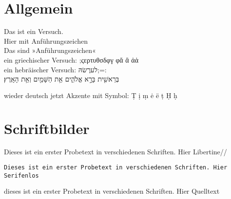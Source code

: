 \documentclass{report}
\begin{document}
\section{Allgemein}
Das ist ein Versuch. \\
Hier mit \glqq Anführungszeichen\grqq\\
Das sind »Anführungszeichen« \\

ein griechischer Versuch: ;ςερτυθσδφγ φἄ ἂ ἀἁ\\

ein hebräischer Versuch: לערֶשׂהּ;=:\\ 
בְּרֵאשִׁ֖ית בָּרָ֣א אֱלֹהִ֑ים אֵ֥ת הַשָּׁמַ֖יִם וְאֵ֥ת הָאָֽרֶץ׃

wieder deutsch
jetzt Akzente mit Symbol: Ṭ ị ṃ ė ë ṭ Ḥ ḥ

\section{Schriftbilder}
Dieses ist ein erster Probetext in verschiedenen Schriften. Hier Libertine//
\begin{verbatim}
Dieses ist ein erster Probetext in verschiedenen Schriften. Hier Serifenlos
\end{verbatim} 
dieses ist ein erster Probetext in verschiedenen Schriften. Hier Quelltext
\end{document}
